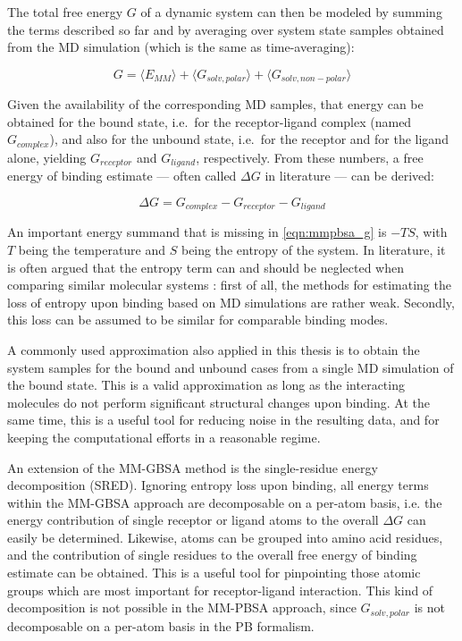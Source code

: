 The total free energy $G$ of a dynamic system can then be modeled by summing the
terms described so far and by averaging over system state samples obtained from
the MD simulation (which is the same as time-averaging):

\begin{equation}
\label{eqn:mmpbsa_g}
G = \langle E_{MM} \rangle + \langle G_{solv,polar} \rangle + \langle G_{solv,non-polar} \rangle
\end{equation}

Given the availability of the corresponding MD samples, that energy can be
obtained for the bound state, i.e.\ for the receptor-ligand complex (named
$G_{complex}$), and also for the unbound state, i.e.\ for the receptor and for
the ligand alone, yielding $G_{receptor}$ and $G_{ligand}$, respectively. From
these numbers, a free energy of binding estimate --- often called $\Delta G$ in
literature --- can be derived:

\begin{equation}
\Delta G = G_{complex} - G_{receptor} - G_{ligand}
\end{equation}

An important energy summand that is missing in \cref{eqn:mmpbsa_g} is $-TS$,
with $T$ being the temperature and $S$ being the entropy of the system. In
literature, it is often argued that the entropy term can and should be neglected
when comparing similar molecular systems \cite{ryde_mmpbsa_2006,
homeyer_gohlke_2012}: first of all, the methods for estimating the loss of
entropy upon binding based on MD simulations are rather weak. Secondly, this
loss can be assumed to be similar for comparable binding modes.

A commonly used approximation also applied in this thesis is to obtain the
system samples for the bound and unbound cases from a single MD simulation of
the bound state. This is a valid approximation as long as the interacting
molecules do not perform significant structural changes upon binding. At the
same time, this is a useful tool for reducing noise in the resulting data, and
for keeping the computational efforts in a reasonable regime.

An extension of the MM-GBSA method is the single-residue energy decomposition
(SRED). Ignoring entropy loss upon binding, all energy terms within the MM-GBSA
approach are decomposable on a per-atom basis, i.e. the energy contribution of
single receptor or ligand atoms to the overall $\Delta G$ can easily be
determined. Likewise, atoms can be grouped into amino acid residues, and the
contribution of single residues to the overall free energy of binding estimate
can be obtained. This is a useful tool for pinpointing those atomic groups which
are most important for receptor-ligand interaction. This kind of decomposition
is not possible in the MM-PBSA approach, since $G_{solv,polar}$ is not
decomposable on a per-atom basis in the PB formalism.

